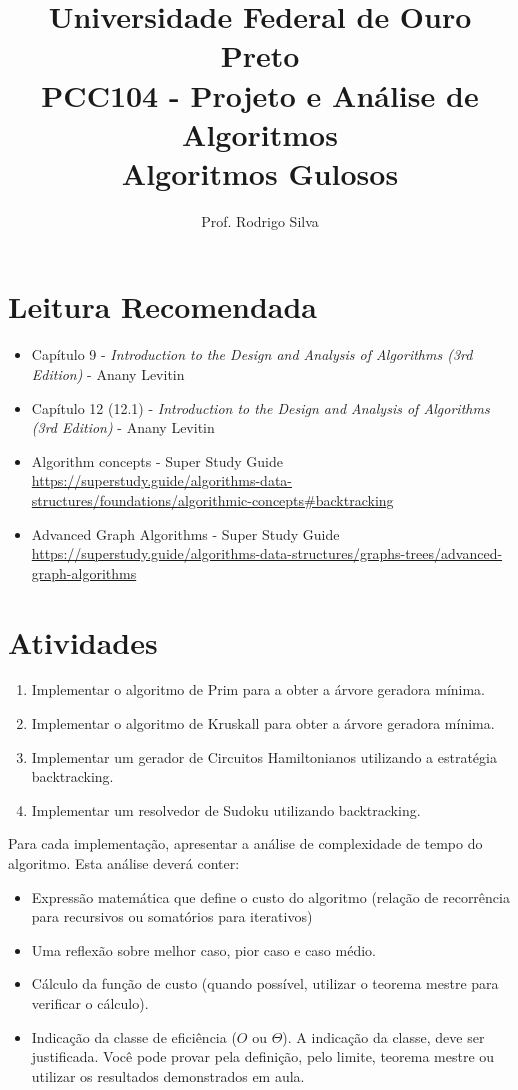 \documentclass{article}
\title{\vspace{-2 cm}Universidade Federal de Ouro Preto \\ PCC104 - Projeto e Análise de Algoritmos \\ Algoritmos Gulosos}
\author{Prof. Rodrigo Silva}
\begin{document}
\maketitle

\section*{Leitura Recomendada}

\begin{itemize}
    \item Capítulo 9 - \textit{Introduction to the Design and Analysis of Algorithms (3rd Edition)} - Anany Levitin 
    \item Capítulo 12 (12.1) - \textit{Introduction to the Design and Analysis of Algorithms (3rd Edition)} - Anany Levitin 
    \item Algorithm concepts - Super Study Guide \url{https://superstudy.guide/algorithms-data-structures/foundations/algorithmic-concepts#backtracking}
    \item Advanced Graph Algorithms - Super Study Guide \url{https://superstudy.guide/algorithms-data-structures/graphs-trees/advanced-graph-algorithms}
\end{itemize}


\section{Atividades}

\begin{enumerate}
    \item Implementar o algoritmo de Prim para a obter a árvore geradora mínima.
    \item Implementar o algoritmo de Kruskall para obter a árvore geradora mínima.
    \item Implementar um gerador de Circuitos Hamiltonianos utilizando a estratégia backtracking. 
    \item Implementar um resolvedor de Sudoku utilizando backtracking.
\end{enumerate}

Para cada implementação, apresentar a análise de complexidade de tempo do algoritmo. Esta análise deverá conter:

\begin{itemize}
    \item Expressão matemática que define o custo do algoritmo (relação de recorrência para recursivos ou somatórios para iterativos) 
    \item Uma reflexão sobre melhor caso, pior caso e caso médio.
    \item Cálculo da função de custo (quando possível, utilizar o teorema mestre para verificar o cálculo).
    \item Indicação da classe de eficiência ($O$ ou $\Theta$). A indicação da classe, deve ser justificada. Você pode provar pela definição, pelo limite, teorema mestre ou utilizar os resultados demonstrados em aula.
\end{itemize}


%
%
\end{document}
